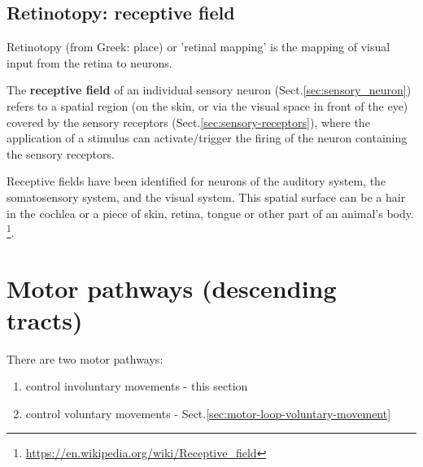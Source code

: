


\subsection{Retinotopy: receptive field}
\label{sec:retinotopy}
\label{sec:receptive-field}

Retinotopy (from Greek: place) or 'retinal mapping' is the mapping of visual
input from the retina to neurons.

The {\bf receptive field} of an individual sensory neuron
(Sect.\ref{sec:sensory_neuron}) refers to a spatial region (on the skin, or via
the visual space in front of the eye) covered by the sensory receptors
(Sect.\ref{sec:sensory-receptors}), where the application of a stimulus can
activate/trigger the firing of the neuron containing the sensory receptors. 

Receptive fields have been identified for neurons of the auditory system, the
somatosensory system, and the visual system. This spatial surface can be a hair
in the cochlea or a piece of skin, retina, tongue or other part of an animal's body.
\footnote{\url{https://en.wikipedia.org/wiki/Receptive_field}}.

\section{Motor pathways (descending tracts)}
\label{sec:motor-pathway}
\label{sec:motor-tracts}
\label{sec:descending-tracts}
\label{sec:motor-loop-involuntary-movement}

There are two motor pathways:
\begin{enumerate}
  \item control involuntary movements - this section
  \item control voluntary movements - Sect.\ref{sec:motor-loop-voluntary-movement}
\end{enumerate}

